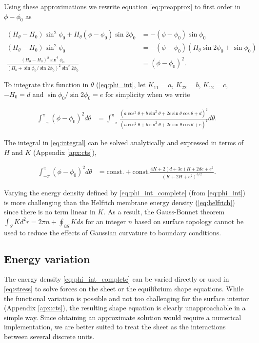 Using these approximations we rewrite equation \ref{eq:preapprox} to first order in $\phi - \phi_0$ as

\begin{align*}
    (H_\theta - H_0) \sin^2\phi_0 + H_\theta (\phi - \phi_0)\sin2\phi_0 &= -(\phi - \phi_0) \sin\phi_0 \\
    (H_\theta - H_0) \sin^2\phi_0 &= -(\phi-\phi_0) (H_\theta \sin2\phi_0 + \sin\phi_0) \\
    \frac{(H_\theta-H_0)^2 \sin^4\phi_0}{(H_\theta + \sin\phi_0 / \sin2\phi_0)^2 \sin^2 2\phi_0} &= (\phi - \phi_0)^2.
\end{align*}

To integrate this function in $\theta$ (\cref{eq:phi_int}, let $K_{11} = a$, $K_{22} = b$, $K_{12} = c$, $-H_0 = d$ and $\sin\phi_0/ \sin 2 \phi_0 = e$ for simplicity when we write

\begin{align}
    \int_{-\pi}^\pi (\phi - \phi_0)^2 d\theta &= \int_{-\pi}^\pi \frac{\left(a\cos^2\theta + b\sin^2\theta + 2c\sin\theta\cos\theta + d \right)^2}{\left(a\cos^2\theta + b\sin^2\theta + 2c\sin\theta\cos\theta + e \right)^2} d\theta. \label{eq:integral}
\end{align}

The integral in \cref{eq:integral} can be solved analytically and expressed in terms of $H$ and $K$ (Appendix \ref{apx:cts}), 

\begin{align}
    \int_{-\pi}^\pi (\phi - \phi_0)^2 d\theta &= \text{const.} + \text{const.} \frac{4 K + 2(d+3e)H + 2de + e^2}{(K + 2H + e^2)^{3/2}}. \label{eq:phi_int_complete}
\end{align}

Varying the energy density defined by \cref{eq:phi_int_complete} (from \cref{eq:phi_int}) is more challenging than the Helfrich membrane energy density (\cref{eq:helfrich}) since there is no term linear in $K$. 
As a result, the Gauss-Bonnet theorem $\int_S K d^2r = 2\pi n + \oint_{\partial S} K ds$ for an integer $n$ based on surface topology cannot be used to reduce the effects of Gaussian curvature to boundary conditions.

\subsection{Energy variation}

The energy density \cref{eq:phi_int_complete} can be varied directly or used in \cref{eq:stress} to solve forces on the sheet or the equilibrium shape equations.
While the functional variation is possible and not too challenging for the surface interior (Appendix \ref{apx:cts}), the resulting shape equation is clearly unapproachable in a simple way.
Since obtaining an approximate solution would require a numerical implementation, we are better suited to treat the sheet as the interactions between several discrete units.

